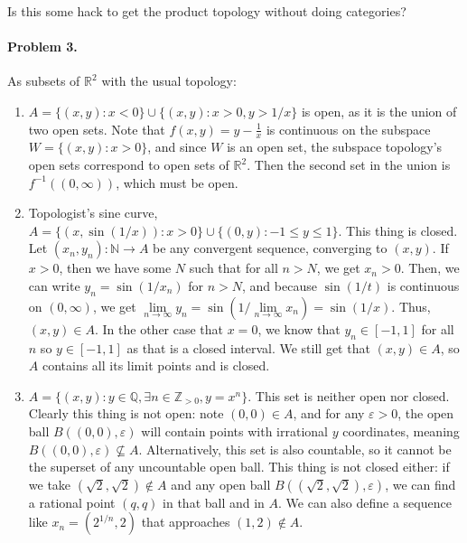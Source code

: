 \documentclass[12pt]{article}
\begin{document}
Is this some hack to get the product topology without doing categories?

\newpage{}
\paragraph{Problem 3.}
As subsets of $\mathbb R^2$ with the usual topology:
\begin{enumerate}
    \item[(1)] $A = \{(x, y) : x < 0\} \cup \{(x, y): x > 0, y > 1/x \}$ is open, as it is the union of two open sets. Note that $f(x, y) = y-\frac{1}{x}$ is continuous on the subspace $W=\{(x, y) : x > 0\}$, and since $W$ is an open set, the subspace topology's open sets correspond to open sets of $\mathbb R^2$. Then the second set in the union is $f^{-1}((0, \infty))$, which must be open.
    \item[(2)] Topologist's sine curve, $A = \{(x, \sin(1/x)) : x > 0\}  \cup \{(0, y) : -1 \le y \le 1\}$. This thing is closed. Let $(x_n, y_n) : \mathbb N \to A$ be any convergent sequence, converging to $(x, y)$. If $x > 0$, then we have some $N$ such that for all $n > N$, we get $x_n > 0$. Then, we can write $y_n = \sin(1/x_n)$ for $n > N$, and because $\sin(1/t)$ is continuous on $(0, \infty)$, we get $\lim\limits_{n\to \infty} y_n = \sin\left(1/\lim\limits_{n\to\infty} x_n\right) = \sin(1/x)$. Thus, $(x, y) \in A$. In the other case that $x = 0$, we know that $y_n \in [-1, 1]$ for all $n$ so $y \in [-1, 1]$ as that is a closed interval. We still get that $(x, y) \in A$, so $A$ contains all its limit points and is closed.
    \item[(3)] $A = \{(x, y) : y \in \mathbb Q, \exists n \in \mathbb Z_{>0}, y = x^n\}$. This set is neither open nor closed. Clearly this thing is not open: note $(0, 0) \in A$, and for any $\varepsilon > 0$, the open ball $B((0, 0), \varepsilon)$ will contain points with irrational $y$ coordinates, meaning $B((0, 0), \varepsilon) \not\subseteq A$. Alternatively, this set is also countable, so it cannot be the superset of any uncountable open ball. This thing is not closed either: if we take $(\sqrt{2}, \sqrt{2}) \not\in A$ and any open ball $B((\sqrt{2}, \sqrt{2}), \varepsilon)$, we can find a rational point $(q, q)$ in that ball and in $A$. We can also define a sequence like $x_n = (2^{1/n}, 2)$ that approaches $(1, 2) \not\in A$.
\end{enumerate}

\newpage{}
\end{document}
